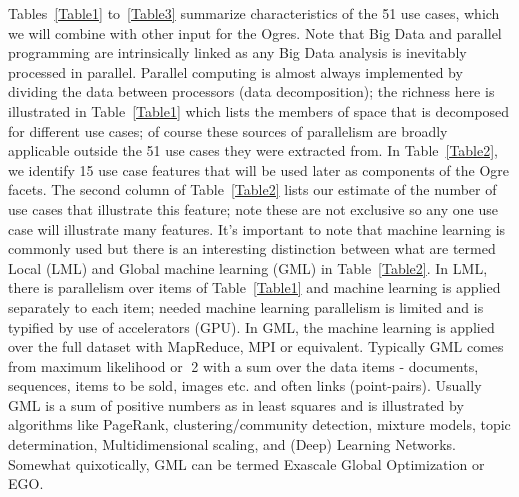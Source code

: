 \documentclass{acm_proc_article-sp}
\begin{document}
Tables~\ref{Table1} to~\ref{Table3} summarize characteristics of the 51 use cases, which we will combine with other input for the Ogres. Note that Big Data and parallel programming are intrinsically linked as any Big Data analysis is inevitably processed in parallel. Parallel computing is almost always implemented by dividing the data between processors (data decomposition); the richness here is illustrated in Table~\ref{Table1} which lists the members of space that is decomposed for different use cases; of course these sources of parallelism are broadly applicable outside the 51 use cases they were extracted from. In Table~\ref{Table2}, we identify 15 use case features that will be used later as components of the Ogre facets. The second column of Table~\ref{Table2} lists our estimate of the number of use cases that illustrate this feature; note these are not exclusive so any one use case will illustrate many features.
It's important to note that machine learning is commonly used but there is an interesting distinction between what are termed Local (LML) and Global machine learning (GML) in Table~\ref{Table2}. In LML, there is parallelism over items of Table~\ref{Table1} and machine learning is applied separately to each item; needed machine learning parallelism is limited and is typified by use of accelerators (GPU). In GML, the machine learning is applied over the full dataset with MapReduce, MPI or equivalent. Typically GML comes from maximum likelihood or 2 with a sum over the data items - documents, sequences, items to be sold, images etc. and often links (point-pairs). Usually GML is a sum of positive numbers as in least squares and is illustrated by algorithms like PageRank, clustering/community detection, mixture models, topic determination, Multidimensional scaling, and (Deep) Learning Networks. Somewhat quixotically, GML can be termed Exascale Global Optimization or EGO. 
\end{document}
